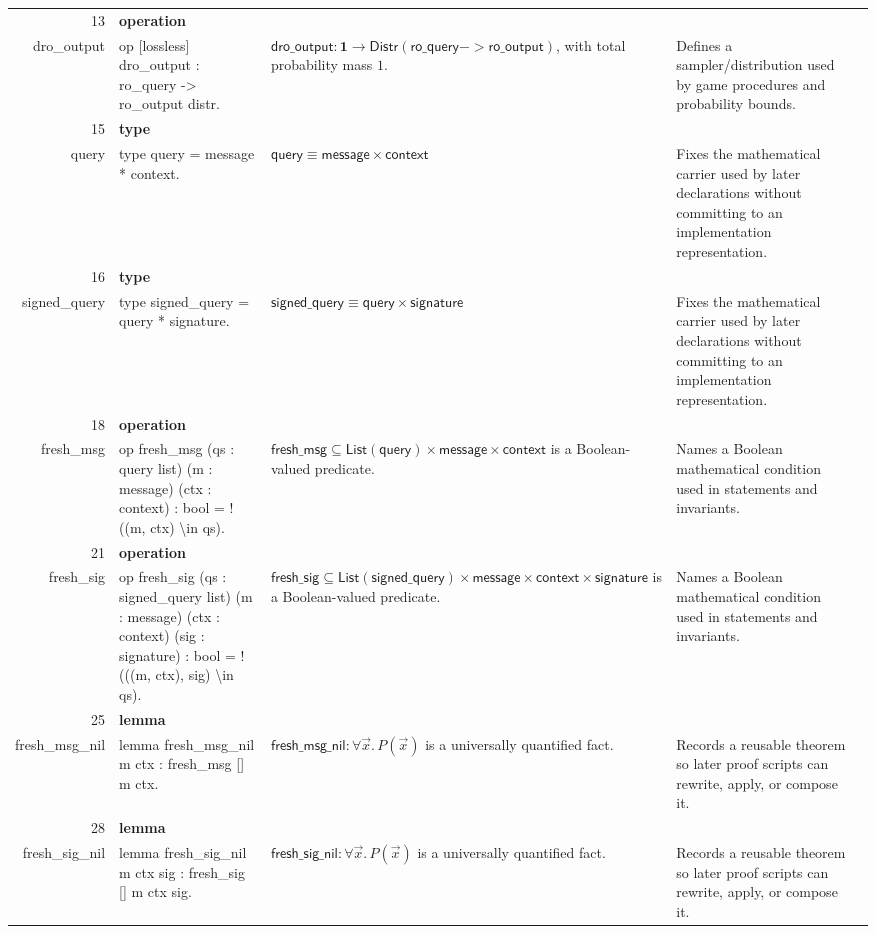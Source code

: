 \documentclass[10pt]{article}
\newcommand{\ec}[1]{\begingroup\ttfamily\scriptsize #1\endgroup}
\begin{document}
\begin{longtable}{r L{0.17\textwidth} L{0.26\textwidth} L{0.27\textwidth} L{0.20\textwidth}}
13 & \textbf{operation}\\\ec{dro\_output} & \ec{op [lossless] dro\_output : ro\_query -> ro\_output distr.} & \(\mathsf{dro\_output} : \mathbf{1} \to \mathsf{Distr}(\mathsf{ro\_query -> ro\_output})\), with total probability mass \(1\). & Defines a sampler/distribution used by game procedures and probability bounds. \\
15 & \textbf{type}\\\ec{query} & \ec{type query = message * context.} & \(\mathsf{query} \equiv \mathsf{message} \times \mathsf{context}\) & Fixes the mathematical carrier used by later declarations without committing to an implementation representation. \\
16 & \textbf{type}\\\ec{signed\_query} & \ec{type signed\_query = query * signature.} & \(\mathsf{signed\_query} \equiv \mathsf{query} \times \mathsf{signature}\) & Fixes the mathematical carrier used by later declarations without committing to an implementation representation. \\
18 & \textbf{operation}\\\ec{fresh\_msg} & \ec{op fresh\_msg (qs : query list) (m : message) (ctx : context) : bool = ! ((m, ctx) \textbackslash{}in qs).} & \(\mathsf{fresh\_msg} \subseteq \mathsf{List}(\mathsf{query}) \times \mathsf{message} \times \mathsf{context}\) is a Boolean-valued predicate. & Names a Boolean mathematical condition used in statements and invariants. \\
21 & \textbf{operation}\\\ec{fresh\_sig} & \ec{op fresh\_sig (qs : signed\_query list) (m : message) (ctx : context) (sig : signature) : bool = ! (((m, ctx), sig) \textbackslash{}in qs).} & \(\mathsf{fresh\_sig} \subseteq \mathsf{List}(\mathsf{signed\_query}) \times \mathsf{message} \times \mathsf{context} \times \mathsf{signature}\) is a Boolean-valued predicate. & Names a Boolean mathematical condition used in statements and invariants. \\
25 & \textbf{lemma}\\\ec{fresh\_msg\_nil} & \ec{lemma fresh\_msg\_nil m ctx : fresh\_msg [] m ctx.} & \(\mathsf{fresh\_msg\_nil} : \forall \vec{x}.\, P(\vec{x})\) is a universally quantified fact. & Records a reusable theorem so later proof scripts can rewrite, apply, or compose it. \\
28 & \textbf{lemma}\\\ec{fresh\_sig\_nil} & \ec{lemma fresh\_sig\_nil m ctx sig : fresh\_sig [] m ctx sig.} & \(\mathsf{fresh\_sig\_nil} : \forall \vec{x}.\, P(\vec{x})\) is a universally quantified fact. & Records a reusable theorem so later proof scripts can rewrite, apply, or compose it. \\

\end{longtable}
\end{document}
